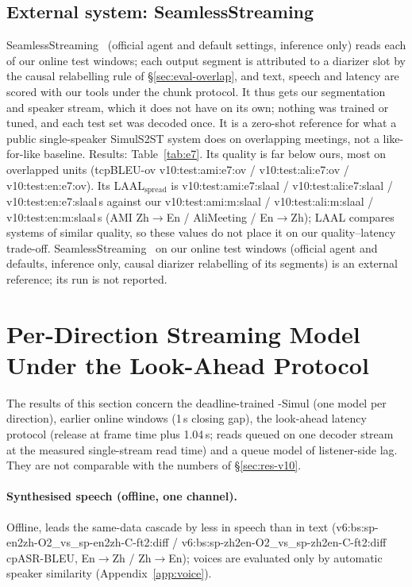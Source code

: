 \subsection{External system: SeamlessStreaming}
\label{app:e7}

\ifEseven
SeamlessStreaming~\citep{seamless2023} (official agent and default settings, inference only) reads each of our online
test windows; each output segment is attributed to a diarizer slot by the causal relabelling rule of
\S\ref{sec:eval-overlap}, and text, speech and latency are scored with our tools under the chunk protocol. It thus gets our
segmentation and speaker stream, which it does not have on its own; nothing was trained or tuned, and each test set was
decoded once. It is a zero-shot reference for what a public single-speaker SimulS2ST system does on overlapping
meetings, not a like-for-like baseline. Results: Table~\ref{tab:e7}.
 Its quality is far below ours, most on
overlapped units (tcpBLEU-ov \num{v10:test:ami:e7:ov} / \num{v10:test:ali:e7:ov} / \num{v10:test:en:e7:ov}). Its
LAAL$_\text{spread}$ is \num{v10:test:ami:e7:slaal} / \num{v10:test:ali:e7:slaal} / \num{v10:test:en:e7:slaal}\,s against our
\num{v10:test:ami:m:slaal} / \num{v10:test:ali:m:slaal} / \num{v10:test:en:m:slaal}\,s (AMI Zh$\rightarrow$En /
AliMeeting / En$\rightarrow$Zh); LAAL compares systems of similar quality, so these values do not place it on our
quality--latency trade-off.
\else
SeamlessStreaming~\citep{seamless2023} on our online test windows (official agent and defaults, inference only, causal
diarizer relabelling of its segments) is an external reference; its run is not reported.
\fi

\section{Per-Direction Streaming Model Under the Look-Ahead Protocol}
\label{app:v9proto}

The results of this section concern the deadline-trained \sys{}-Simul (one model per direction), earlier online windows
(1\,s closing gap), the look-ahead latency protocol (release at frame time plus 1.04\,s; reads queued on one decoder
stream at the measured single-stream read time) and a queue model of listener-side lag. They are not comparable with the
numbers of \S\ref{sec:res-v10}.



\paragraph{Synthesised speech (offline, one channel).} Offline, \sys{} leads the same-data cascade by less in speech than in
text (\num{v6:bs:sp-en2zh-O2_vs_sp-en2zh-C-ft2:diff} / \num{v6:bs:sp-zh2en-O2_vs_sp-zh2en-C-ft2:diff} cpASR-BLEU,
En$\rightarrow$Zh / Zh$\rightarrow$En); voices are evaluated only by automatic speaker similarity
(Appendix~\ref{app:voice}).

